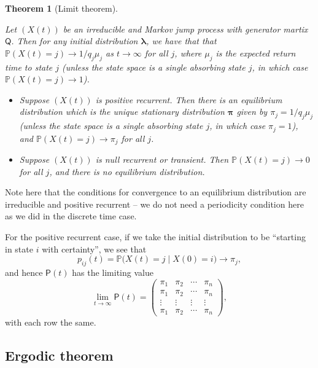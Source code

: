 \documentclass[
  a4paper,
]{article}
\providecommand{\tightlist}{%
  \setlength{\itemsep}{0pt}\setlength{\parskip}{0pt}}
\newtheorem{theorem}{Theorem}[section]
\theoremstyle{definition}
\theoremstyle{definition}
\theoremstyle{definition}
\theoremstyle{remark}
\begin{document}
\begin{theorem}[Limit theorem]
\protect\hypertarget{thm:limit-cont}{}\label{thm:limit-cont}

Let \((X(t))\) be an irreducible and Markov jump process with generator martix \(\mathsf Q\). Then for any initial distribution \(\boldsymbol\lambda\), we have that that \(\mathbb P(X(t) = j) \to 1/q_j\mu_j\) as \(t \to \infty\) for all \(j\), where \(\mu_j\) is the expected return time to state \(j\) (unless the state space is a single absorbing state \(j\), in which case \(\mathbb P(X(t) = j) \to 1\)).

\begin{itemize}
\tightlist
\item
  Suppose \((X(t))\) is positive recurrent. Then there is an equilibrium distribution which is the unique stationary distribution \(\boldsymbol\pi\) given by \(\pi_j = 1/q_j\mu_j\) (unless the state space is a single absorbing state \(j\), in which case \(\pi_j = 1\)), and \(\mathbb P(X(t) = j) \to \pi_j\) for all \(j\).
\item
  Suppose \((X(t))\) is null recurrent or transient. Then \(\mathbb P(X(t) = j) \to 0\) for all \(j\), and there is no equilibrium distribution.
\end{itemize}

\end{theorem}

Note here that the conditions for convergence to an equilibrium distribution are irreducible and positive recurrent -- we do not need a periodicity condition here as we did in the discrete time case.

For the positive recurrent case, if we take the initial distribution to be ``starting in state \(i\) with certainty'', we see that
\[ p_{ij}(t) = \mathbb P\big(X(t) = j \mid X(0) = i\big) \to \pi_j , \]
and hence \(\mathsf P(t)\) has the limiting value
\[ \lim_{t \to \infty} \mathsf P(t) = \begin{pmatrix} \pi_1 & \pi_2 & \cdots & \pi_n \\
\pi_1 & \pi_2 & \cdots & \pi_n \\
\vdots & \vdots & \vdots & \vdots \\
\pi_1 & \pi_2 & \cdots & \pi_n \end{pmatrix} , \]
with each row the same.

\hypertarget{ergodic-cont}{%
\subsection{Ergodic theorem}\label{ergodic-cont}}
\end{document}
